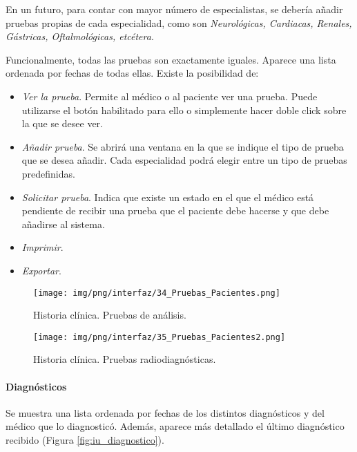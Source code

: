 \documentclass[a4paper,oneside,11pt]{book}
\begin{document}
			En un futuro, para contar con mayor número de especialistas, se debería añadir pruebas propias de cada especialidad, como son \textit{Neurológicas, Cardiacas, Renales, Gástricas, Oftalmológicas, etcétera}.
			
			Funcionalmente, todas las pruebas son exactamente iguales. Aparece una lista ordenada por fechas de todas ellas. Existe la posibilidad de:
			
			\begin{itemize}
				\item \textit{Ver la prueba}. Permite al médico o al paciente ver una prueba. Puede utilizarse el botón habilitado para ello o simplemente hacer doble click sobre la que se desee ver.
				\item \textit{Añadir prueba}. Se abrirá una ventana en la que se indique el tipo de prueba que se desea añadir. Cada especialidad podrá elegir entre un tipo de pruebas predefinidas.
				\item \textit{Solicitar prueba}. Indica que existe un estado en el que el médico está pendiente de recibir una prueba que el paciente debe hacerse y que debe añadirse al sistema.
				\item \textit{Imprimir}. 
				\item \textit{Exportar}. 
			\end{itemize}
			
			
			\begin{figure}[H]
			  \centering
			    \texttt{[image: img/png/interfaz/34\_Pruebas\_Pacientes.png]}
			  \caption{Historia clínica. Pruebas de análisis.}
			  \label{fig:iu_prueba_analisis}
			\end{figure}
			
			\begin{figure}[H]
			  \centering
			    \texttt{[image: img/png/interfaz/35\_Pruebas\_Pacientes2.png]}
			  \caption{Historia clínica. Pruebas radiodiagnósticas.}
			  \label{fig:iu_prueba_radio}
			\end{figure}
				
		
		\paragraph{Diagnósticos} %
		\label{par:diagnosticos}
		
			Se muestra una lista ordenada por fechas de los distintos diagnósticos y del médico que lo diagnosticó. Además, aparece más detallado el último diagnóstico recibido (Figura \ref{fig:iu_diagnostico}). 
			
\end{document}
